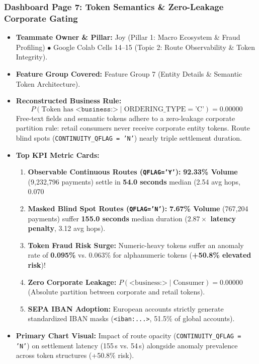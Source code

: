 \documentclass[11pt,a4paper]{article}
\begin{document}
\subsubsection{Dashboard Page 7: Token Semantics \& Zero-Leakage Corporate Gating}
\begin{itemize}
    \item \textbf{Teammate Owner \& Pillar:} Joy (Pillar 1: Macro Ecosystem \& Fraud Profiling) $\bullet$ Google Colab Cells 14--15 (Topic 2: Route Observability \& Token Integrity).
    \item \textbf{Feature Group Covered:} Feature Group 7 (Entity Details \& Semantic Token Architecture).
    \item \textbf{Reconstructed Business Rule:}
    \begin{equation}
    P(\text{Token has } \texttt{<business:>} \mid \text{ORDERING\_TYPE} = \text{'C'}) = 0.00000
    \end{equation}
    Free-text fields and semantic tokens adhere to a zero-leakage corporate partition rule: retail consumers never receive corporate entity tokens. Route blind spots (\texttt{CONTINUITY\_QFLAG = 'N'}) nearly triple settlement duration.
    \item \textbf{Top KPI Metric Cards:}
    \begin{enumerate}
        \item \textbf{Observable Continuous Routes (\texttt{QFLAG='Y'}):} \textbf{92.33\% Volume} (9,232,796 payments) settle in \textbf{54.0 seconds} median (2.54 avg hops, 0.070%
        \item \textbf{Masked Blind Spot Routes (\texttt{QFLAG='N'}):} \textbf{7.67\% Volume} (767,204 payments) suffer \textbf{155.0 seconds} median duration (\textbf{$2.87\times$ latency penalty}, 3.12 avg hops).
        \item \textbf{Token Fraud Risk Surge:} Numeric-heavy tokens suffer an anomaly rate of \textbf{0.095\%} vs. 0.063\% for alphanumeric tokens (\textbf{+50.8\% elevated risk})!
        \item \textbf{Zero Corporate Leakage:} $P(\text{<business:>} \mid \text{Consumer}) = \mathbf{0.00000}$ (Absolute partition between corporate and retail tokens).
        \item \textbf{SEPA IBAN Adoption:} European accounts strictly generate standardized IBAN masks (\texttt{<iban:...>}, 51.5\% of global accounts).
    \end{enumerate}
    \item \textbf{Primary Chart Visual:} Impact of route opacity (\texttt{CONTINUITY\_QFLAG = 'N'}) on settlement latency (155\,s vs. 54\,s) alongside anomaly prevalence across token structures (+50.8\% risk).

\end{itemize}
\end{document}

